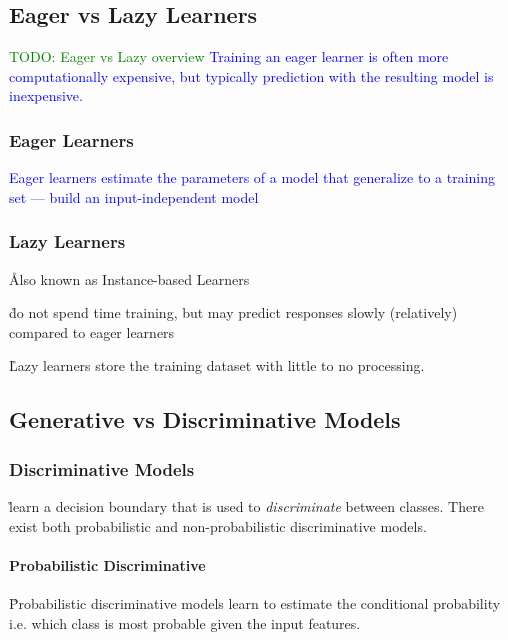 \subsection{Eager vs Lazy Learners}

\textcolor{green}{TODO: Eager vs Lazy overview}
\textcolor{blue}{Training an eager learner is often more computationally expensive, but typically prediction with the resulting model is inexpensive.}

\subsubsection{Eager Learners}

\textcolor{blue}{Eager learners estimate the parameters of a model that generalize to a training set --- build an input-independent model}

\subsubsection{Lazy Learners}

\r{Also known as Instance-based Learners}

\r{do not spend time training, but may predict responses slowly (relatively) compared to eager learners}

\r{Lazy learners store the training dataset with little to no processing.}


\subsection{Generative vs Discriminative Models}



\subsubsection{Discriminative Models}

\r{learn a decision boundary that is used to \textit{discriminate} between classes. There exist both probabilistic and non-probabilistic discriminative models.}

\paragraph{Probabilistic Discriminative}

\r{Probabilistic discriminative models learn to estimate the conditional probability i.e. which class is most probable given the input features.}

